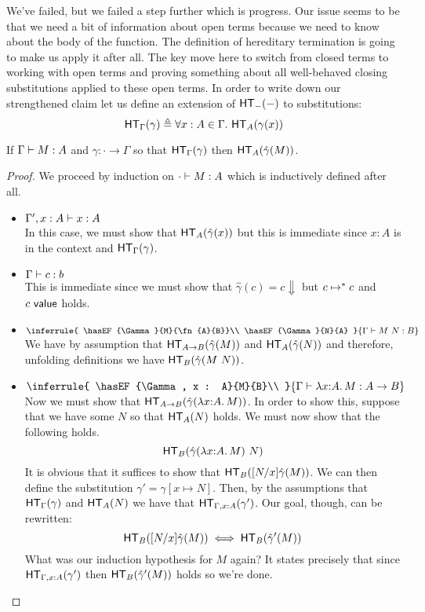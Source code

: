 \documentclass{article}
\begin{document}
We've failed, but we failed a step further which is progress. Our
issue seems to be that we need a bit of information about open terms
because we need to know about the body of the function. The definition
of hereditary termination is going to make us apply it after all. The
key move here to switch from closed terms to working with open terms
and proving something about all well-behaved closing substitutions
applied to these open terms. In order to write down our strengthened
claim let us define an extension of $\mathsf{HT}_{-}(-)$ to substitutions:
\[
  \mathsf{HT}_{\Gamma}(\gamma) \triangleq \forall x : A \in \Gamma.\ \mathsf{HT}_{A}(\gamma(x))
\]
\begin{theorem}
  If $\Gamma \vdash M : A$ and $\gamma : \cdot \to \Gamma$ so that
  $\mathsf{HT}_{\Gamma}(\gamma)$ then $\mathsf{HT}_{A}(\hat{\gamma}(M))$.
\end{theorem}
\begin{proof}
  We proceed by induction on $\cdot \vdash M : A$ which is
  inductively defined after all.
  \begin{itemize}
  \setlength\itemsep{1em}
  \item $\Gamma', x : A \vdash x : A$\\
    In this case, we must show that $\mathsf{HT}_{A}(\hat{\gamma}(x))$ but
    this is immediate since $x : A$ is in the context and
    $\mathsf{HT}_{\Gamma}(\gamma)$.
  \item $\Gamma \vdash c : b$\\
    This is immediate since we must show that
    $\hat{\gamma}(c) = c \Downarrow$ but $c \mapsto^* c$ and
    $c\ \mathsf{value}$ holds.
  \item $\inferrule{
      \hasEF{\Gamma}{M}{\fn{A}{B}}\\
      \hasEF{\Gamma}{N}{A}
    }{\hasEF{\Gamma}{\ap{M}{N}}{B}}$\\
    We have by assumption that $\mathsf{HT}_{A \to B}(\hat{\gamma}(M))$
    and $\mathsf{HT}_{A}(\hat{\gamma}(N))$ and therefore, unfolding
    definitions we have $\mathsf{HT}_{B}(\hat{\gamma}(M\ N))$.
  \item
    $\inferrule{
      \hasEF{\Gamma, x : A}{M}{B}\\
    }{\hasEF{\Gamma}{\lam{x}{A}{M}}{\fn{A}{B}}}$\\

    Now we must show that
    $\mathsf{HT}_{A \to B}(\hat{\gamma}(\lambda x {:} A.\, M))$. In order to show
    this, suppose that we have some $N$ so that $\mathsf{HT}_{A}(N)$
    holds. We must now show that the following holds.
    \[
      \mathsf{HT}_{B}(\hat{\gamma}(\lambda x {:} A.\, M)\ N)
    \]
    It is obvious that it suffices to show that
    $\mathsf{HT}_{B}([N/x]\hat{\gamma}(M))$. We can then define the
    substitution $\gamma' = \gamma[x \mapsto N]$. Then, by the
    assumptions that $\mathsf{HT}_{\Gamma}(\gamma)$ and $\mathsf{HT}_{A}(N)$ we
    have that $\mathsf{HT}_{\Gamma, x : A}(\gamma')$. Our goal, though, can
    be rewritten:
    \[
      \mathsf{HT}_{B}([N/x]\hat{\gamma}(M)) \iff
      \mathsf{HT}_{B}(\hat{\gamma}'(M))
    \]
    What was our induction hypothesis for $M$ again? It states
    precisely that since $\mathsf{HT}_{\Gamma, x : A}(\gamma')$ then
    $\mathsf{HT}_{B}(\hat{\gamma}'(M))$ holds so we're done. \qedhere
  \end{itemize}
\end{proof}
\end{document}
